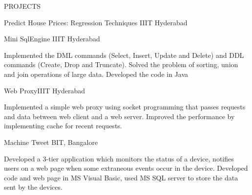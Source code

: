 \documentclass{resume} %
\begin{document}
\begin{rSection}{PROJECTS}
\begin{rSubsection}{Predict House Prices: Regression Techniques }{IIIT Hyderabad}{}
\end{rSubsection} 



\begin{rSubsection}{Mini SqlEngine }{IIIT Hyderabad}{} %

\vspace{-3pt}

\item Implemented the DML commands (Select, Insert, Update and Delete) and DDL commands (Create, Drop and Truncate). Solved the problem of sorting, union and join operations of large data. Developed the code in Java

\end{rSubsection}

\begin{rSubsection}{Web Proxy}{IIIT Hyderabad}{} %

\vspace{-3pt}

\item Implemented a simple web proxy using socket programming that passes requests and data between web client and a web server. Improved the performance by implementing cache for recent requests.

\end{rSubsection} 




\begin{rSubsection}{Machine Tweet }{BIT, Bangalore}{} %

\vspace{-3pt}

\item Developed a 3-tier application which monitors the status of a device, notifies users on a web page when some extraneous events occur in the device. Developed code and web page in MS Visual Basic, used MS SQL server to store the data sent by the devices.


\end{rSubsection}





\end{rSection} 
\end{document}
